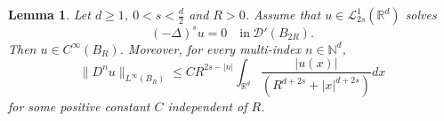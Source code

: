 \documentclass[letterpaper, 11pt,  reqno]{amsart}
\newtheorem{lemma}[theorem]{Lemma}
\theoremstyle{definition}
\theoremstyle{remark}
\numberwithin{equation}{section}
\newcommand{\N}{{\mathbb N}}
\newcommand{\R}{{\mathbb R}}
\begin{document}
	\begin{lemma}\label{lemma_1}
		Let $d\ge 1$,  $0<s<\frac{d}{2}$ and $R>0$. Assume that $u\in \mathscr{L}^{1}_{2s}(\R^d)$ solves 
		\begin{equation*}\label{eq_00}
			(-\Delta)^{s}u=0\quad \text{in}\ \mathscr{D}'(B_{2R}).
		\end{equation*}
		Then $u\in C^{\infty}(B_R)$. Moreover, for every multi-index $n\in \N^{d}$,
		$$\|D^{n}u\|_{L^{\infty}({B_R})}\le CR^{2s-|n|}\int_{\R^d}\frac{|u(x)|}{(R^{d+2s}+|x|^{d+2s})}dx$$
		for some positive constant $C$ independent of $R$.
	\end{lemma}
\end{document}
